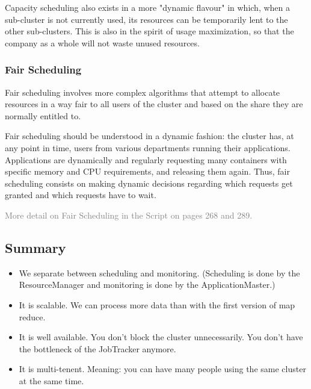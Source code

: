 Capacity scheduling also exists in a more "dynamic flavour" in which, when a sub-cluster is not currently used, its resources can be temporarily lent to the other sub-clusters. This is also in the spirit of usage maximization, so that the company as a whole will not waste unused resources.

\subsubsection{Fair Scheduling}
Fair scheduling involves more complex algorithms that attempt to allocate resources in a way fair to all users of the cluster and based on the share they are normally entitled to.

Fair scheduling should be understood in a dynamic fashion: the cluster has, at any point in time, users from various departments running their applications. Applications are dynamically and regularly requesting many containers with specific memory and CPU requirements, and releasing them again. Thus, fair scheduling consists on making dynamic decisions regarding which requests get granted and which requests have to wait.

\textcolor{grey}{More detail on Fair Scheduling in the Script on pages 268 and 289.}


\subsection{Summary}
\begin{itemize}
    \item We separate between scheduling and monitoring. (Scheduling is done by the ResourceManager and monitoring is done by the ApplicationMaster.)
    \item It is scalable. We can process more data than with the first version of map reduce.
    \item It is well available. You don't block the cluster unnecessarily. You don't have the bottleneck of the JobTracker anymore.
    \item It is multi-tenent. Meaning: you can have many people using the same cluster at the same time.
\end{itemize}
